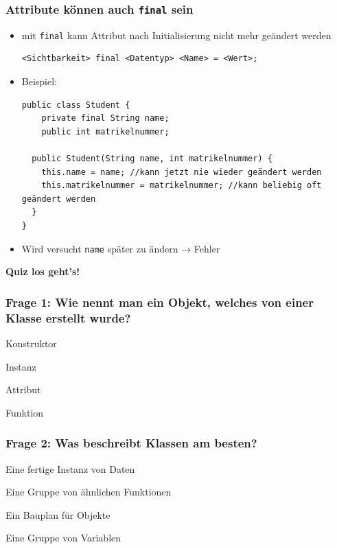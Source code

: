 \documentclass{../../presentation}
\begin{document}
\begin{frame}[fragile]
	\frametitle{Attribute können auch \texttt{final} sein}

	\begin{itemize}
		\item<2-> mit \texttt{final} kann Attribut nach Initialisierung nicht mehr geändert werden
		      \begin{verbatim}
<Sichtbarkeit> final <Datentyp> <Name> = <Wert>;
		\end{verbatim}
		\item<3-> Beispiel:
		      \begin{verbatim}
public class Student {
    private final String name;
    public int matrikelnummer;

  public Student(String name, int matrikelnummer) {
    this.name = name; //kann jetzt nie wieder geändert werden
    this.matrikelnummer = matrikelnummer; //kann beliebig oft geändert werden
  }
}
\end{verbatim}

		\item<4-> Wird versucht \texttt{name} später zu ändern → \alert{Fehler}
	\end{itemize}

\end{frame}

\begin{frame}[plain]
	\centering
	{\Huge\bfseries{Quiz los geht's!}}
\end{frame}

\begin{frame}[fragile]
	\frametitle{Frage 1: Wie nennt man ein Objekt, welches von einer Klasse erstellt wurde?}
	\begin{ausgabe}
		Konstruktor
	\end{ausgabe}
	\begin{ausgabe}
		\textcolor<2->{green!100!black}{Instanz}
	\end{ausgabe}
	\begin{ausgabe}
		Attribut
	\end{ausgabe}
	\begin{ausgabe}
		Funktion
	\end{ausgabe}

\end{frame}

\begin{frame}[fragile]
	\frametitle{Frage 2: Was beschreibt Klassen am besten?}
	\begin{ausgabe}
		Eine fertige Instanz von Daten
	\end{ausgabe}
	\begin{ausgabe}
		Eine Gruppe von ähnlichen Funktionen
	\end{ausgabe}
	\begin{ausgabe}
		\textcolor<2->{green!100!black}{Ein Bauplan für Objekte}
	\end{ausgabe}
	\begin{ausgabe}
		Eine Gruppe von Variablen
	\end{ausgabe}
\end{frame}
\end{document}
